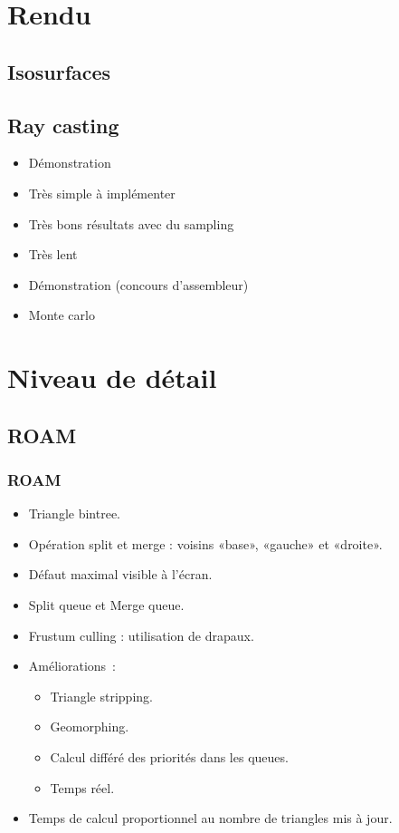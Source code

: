 \documentclass{beamer}
\begin{document}
\section{Rendu}

\subsection{Isosurfaces}
\begin{frame}
  
\end{frame}

\subsection{Ray casting}

\begin{frame}
  \begin{itemize}
  \item Démonstration
  \item Très simple à implémenter
  \item Très bons résultats avec du sampling
  \item Très lent
  \item Démonstration (concours d'assembleur)
  \item Monte carlo
  \end{itemize}
\end{frame}

\section[LOD]{Niveau de détail}

\subsection{ROAM}
\begin{frame}
  \frametitle{ROAM}
  \begin{itemize}
  \item Triangle bintree.
  \item Opération split et merge : voisins «base», «gauche» et «droite».
  \item Défaut maximal visible à l'écran.
  \item Split queue et Merge queue.
  \item Frustum culling : utilisation de drapaux.
  \item Améliorations~:
    \begin{itemize}
    \item Triangle stripping.
    \item Geomorphing.
    \item Calcul différé des priorités dans les queues.
    \item Temps réel.
    \end{itemize}
  \item Temps de calcul proportionnel au nombre de triangles mis à jour.
  \end{itemize}
\end{frame}
\end{document}
